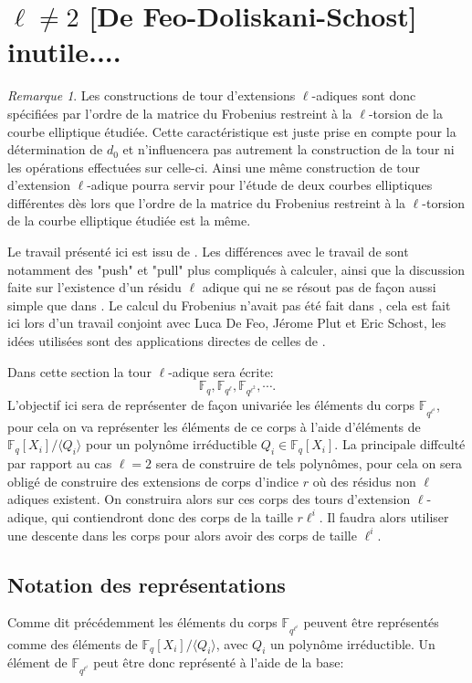 \documentclass[10pt,a4paper]{book}
\theoremstyle{plain}
\theoremstyle{definition}
\theoremstyle{definition}
\theoremstyle{definition}
\theoremstyle{definition}
\theoremstyle{remark}
\newtheorem{rem}[thm]{Remarque}
\theoremstyle{remark}
\begin{document}
\section{$\ell \neq 2$ [De Feo-Doliskani-Schost] inutile....}

\begin{rem}
Les constructions de tour d'extensions $\ell$-adiques sont donc spécifiées par l'ordre de la matrice du Frobenius restreint à la $\ell$-torsion de la courbe elliptique étudiée. Cette caractéristique est juste prise en compte pour la détermination de $d_0$ et n'influencera pas autrement la construction de la tour ni les opérations effectuées sur celle-ci. Ainsi une même construction de tour d'extension $\ell$-adique pourra servir pour l'étude de deux courbes elliptiques différentes dès lors que l'ordre de la matrice du Frobenius restreint à la $\ell$-torsion de la courbe elliptique étudiée est la même.
\end{rem}

Le travail présenté ici est issu de \cite{DeFeo-Doliskani-Schost13}. Les différences avec le travail de \cite{Doliskani-Schost15} sont notamment des "push" et "pull" plus compliqués à calculer, ainsi que la discussion faite sur l'existence d'un résidu $\ell$ adique qui ne se résout pas de façon aussi simple que dans \cite{Doliskani-Schost15}. Le calcul du Frobenius n'avait pas été fait dans \cite{DeFeo-Doliskani-Schost13}, cela est fait ici lors d'un travail conjoint avec Luca De Feo, Jérome Plut et Eric Schost, les idées utilisées sont des applications directes de celles de \cite{Doliskani-Schost15}.

Dans cette section la tour $\ell$-adique sera écrite:
\[
\mathbb{F}_q, \mathbb{F}_{q^\ell}, \mathbb{F}_{q^{\ell^2}}, \cdots.
\]
L'objectif ici sera de représenter de façon univariée les éléments du corps $\mathbb{F}_{q^{\ell^i}}$, pour cela on va représenter les éléments de ce corps à l'aide d'éléments de $\mathbb{F}_{q}[X_i]/\langle Q_i \rangle$ pour un polynôme irréductible $Q_i \in \mathbb{F}_q[X_i]$. La principale diffculté par rapport au cas $\ell=2$ sera de construire de tels polynômes, pour cela on sera obligé de construire des extensions de corps d'indice $r$ où des résidus non $\ell$ adiques existent. On construira alors sur ces corps des tours d'extension $\ell$-adique, qui contiendront donc des corps de la taille $r\ell^i$. Il faudra alors utiliser une descente dans les corps pour alors avoir des corps de taille $\ell^i$.

\subsection{Notation des représentations}
Comme dit précédemment les éléments du corps $\mathbb{F}_{q^{\ell^i}}$ peuvent être représentés comme des éléments de $\mathbb{F}_q[X_i]/\langle Q_i \rangle $, avec $Q_i$ un polynôme irréductible. Un élément de $\mathbb{F}_{q^{\ell^i}}$ peut être donc représenté à l'aide de la base:
\end{document}
